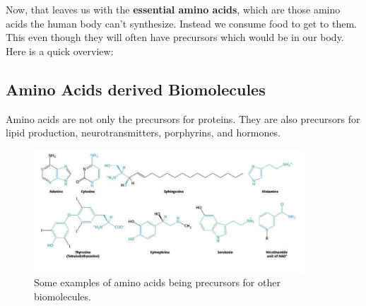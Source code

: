 \documentclass[../main.tex]{subfiles}
\begin{document}
Now, that leaves us with the \textbf{\gls{essential amino acids}}, which are those amino acids the human body can't synthesize. Instead we consume food to get to them. This even though they will often have precursors which would be in our body. Here is a quick overview:

\begin{figure}[H]
	\centering
	\hfill
	\caption{}
\end{figure}

\subsection{Amino Acids derived Biomolecules}

Amino acids are not only the precursors for proteins. They are also precursors for lipid production, neurotransmitters, porphyrins, and hormones. 

\begin{figure}[H]
	\centering
	\includegraphics[width=0.9\textwidth]{aa_derivates_ex}
	\caption{Some examples of amino acids being precursors for other biomolecules.}
	\label{fig:aaderivatesex}
\end{figure}
\end{document}
